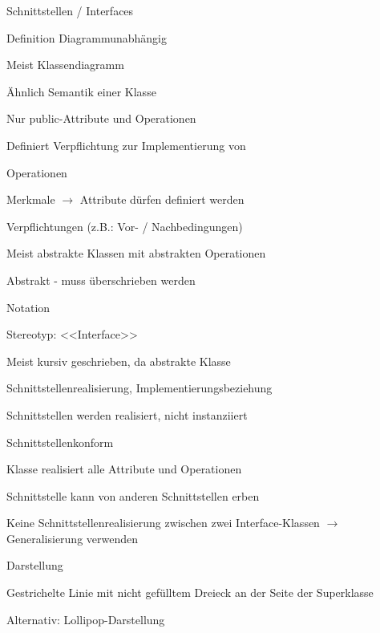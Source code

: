 \documentclass[a4paper]{article}
\begin{document}
\begin{multicols}{3}
  Schnittstellen / Interfaces
  \begin{itemize*}
    \item Definition Diagrammunabhängig
    \begin{itemize*}
      \item Meist Klassendiagramm
    \end{itemize*}
    \item Ähnlich Semantik einer Klasse
    \begin{itemize*}
      \item Nur public-Attribute und Operationen
    \end{itemize*}
    \item Definiert Verpflichtung zur Implementierung von
    \begin{itemize*}
      \item Operationen
      \item Merkmale $\rightarrow$ Attribute dürfen definiert werden
      \item Verpflichtungen (z.B.: Vor- / Nachbedingungen)
    \end{itemize*}
    \item Meist abstrakte Klassen mit abstrakten Operationen
    \item Abstrakt - muss überschrieben werden
    \item Notation
    \begin{itemize*}
      \item Stereotyp: <<Interface>>
      \item Meist kursiv geschrieben, da abstrakte Klasse
    \end{itemize*}
  \end{itemize*}

  Schnittstellenrealisierung, Implementierungsbeziehung
  \begin{itemize*}
    \item Schnittstellen werden realisiert, nicht instanziiert
    \item Schnittstellenkonform
    \begin{itemize*}
      \item Klasse realisiert alle Attribute und Operationen
    \end{itemize*}
    \item Schnittstelle kann von anderen Schnittstellen erben
    \item Keine Schnittstellenrealisierung zwischen zwei Interface-Klassen $\rightarrow$ Generalisierung verwenden
    \item Darstellung
    \begin{itemize*}
      \item Gestrichelte Linie mit nicht gefülltem Dreieck an der Seite der Superklasse
      \item Alternativ: Lollipop-Darstellung
    \end{itemize*}
  \end{itemize*}



\end{multicols}
\end{document}
